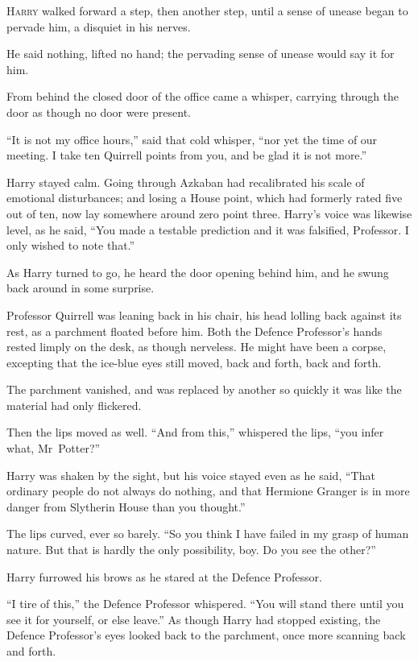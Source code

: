 
\lettrine{H}{arry} walked forward a step, then another step, until a sense of unease began to pervade him, a disquiet in his nerves.

He said nothing, lifted no hand; the pervading sense of unease would say it for him.

From behind the closed door of the office came a whisper, carrying through the door as though no door were present.

“It is not my office hours,” said that cold whisper, “nor yet the time of our meeting. I take ten Quirrell points from you, and be glad it is not more.”

Harry stayed calm. Going through Azkaban had recalibrated his scale of emotional disturbances; and losing a House point, which had formerly rated five out of ten, now lay somewhere around zero point three. Harry’s voice was likewise level, as he said, “You made a testable prediction and it was falsified, Professor. I only wished to note that.”

As Harry turned to go, he heard the door opening behind him, and he swung back around in some surprise.

Professor Quirrell was leaning back in his chair, his head lolling back against its rest, as a parchment floated before him. Both the Defence Professor’s hands rested limply on the desk, as though nerveless. He might have been a corpse, excepting that the ice-blue eyes still moved, back and forth, back and forth.

The parchment vanished, and was replaced by another so quickly it was like the material had only flickered.

Then the lips moved as well. “And from this,” whispered the lips, “you infer what, Mr~Potter?”

Harry was shaken by the sight, but his voice stayed even as he said, “That ordinary people do not always do nothing, and that Hermione Granger is in more danger from Slytherin House than you thought.”

The lips curved, ever so barely. “So you think I have failed in my grasp of human nature. But that is hardly the only possibility, boy. Do you see the other?”

Harry furrowed his brows as he stared at the Defence Professor.

“I tire of this,” the Defence Professor whispered. “You will stand there until you see it for yourself, or else leave.” As though Harry had stopped existing, the Defence Professor’s eyes looked back to the parchment, once more scanning back and forth.

